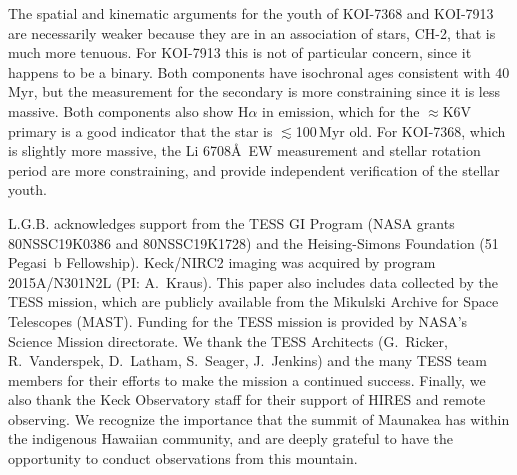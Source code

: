 \documentclass[12pt,twocolumn,linenumbers]{aastex63}
\begin{document}
The spatial and kinematic arguments for the youth of KOI-7368 and
KOI-7913 are necessarily weaker because they are in an association of
stars, CH-2, that is much more tenuous.  For KOI-7913 this is not of
particular concern, since it happens to be a binary.  Both components
have isochronal ages consistent with $40$\,Myr, but the measurement
for the secondary is more constraining since it is less massive.  Both
components also show H$\alpha$ in emission, which for the $\approx$K6V
primary is a good indicator that the star is $\lesssim$100$\,$Myr old.
For KOI-7368, which is slightly more massive, the Li 6708\AA\ EW
measurement and stellar rotation period are more constraining, and
provide independent verification of the stellar youth.







\acknowledgements
\raggedbottom
%
L.G.B{.} acknowledges support from the TESS GI Program (NASA grants
80NSSC19K0386 and 80NSSC19K1728) and the Heising-Simons Foundation (51 Pegasi~b
Fellowship).
%
%
Keck/NIRC2 imaging was acquired by program 2015A/N301N2L
(PI: A.~Kraus). %
%
%
This paper also includes data collected by the TESS mission, which are
publicly available from the Mikulski Archive for Space Telescopes
(MAST).
%
Funding for the TESS mission is provided by NASA's Science Mission
directorate.
%
We thank the TESS Architects (G.~Ricker, R.~Vanderspek, D.~Latham,
S.~Seager, J.~Jenkins) and the many TESS team members for their
efforts to make the mission a continued success.
%
%
%
%
Finally, we also thank the Keck Observatory staff for their support of
HIRES and remote observing.  We recognize the importance that the
summit of Maunakea has within the indigenous Hawaiian community, and
are deeply grateful to have the opportunity to conduct observations
from this mountain.
%
%
\end{document}
